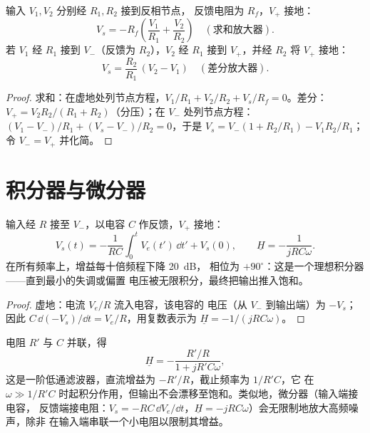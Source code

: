 \begin{proposition}[求和放大器与差分放大器]\label{prop:b1:operational-amplifier:sumdiff}
输入 $V_1, V_2$ 分别经 $R_1, R_2$ 接到反相节点，
反馈电阻为 $R_f$，$V_+$ 接地：
\[
V_s = -R_f\left(\frac{V_1}{R_1} + \frac{V_2}{R_2}\right)
\quad (\text{求和放大器}).
\]
若 $V_1$ 经 $R_1$ 接到 $V_-$（反馈为 $R_2$），$V_2$ 经
$R_1$ 接到 $V_+$，并经 $R_2$ 将 $V_+$ 接地：
\[
V_s = \frac{R_2}{R_1}\,(V_2 - V_1)
\quad (\text{差分放大器}).
\]
\end{proposition}

\begin{proof}
求和：在虚地处列节点方程，$V_1/R_1 + V_2/R_2 + V_s/R_f =
0$。差分：$V_+ = V_2R_2/(R_1 + R_2)$（分压）；在 $V_-$ 处列节点方程：
$(V_1 - V_-)/R_1 + (V_s - V_-)/R_2 = 0$，于是 $V_s = V_-(1 + R_2/R_1) -
V_1R_2/R_1$；令 $V_- = V_+$ 并化简。
\end{proof}

\section{积分器与微分器}

\begin{proposition}[积分器]\label{prop:b1:operational-amplifier:integrator}
输入经 $R$ 接至 $V_-$，以电容 $C$ 作反馈，$V_+$
接地：
\[
V_s(t) = -\frac{1}{RC}\int_0^t V_e(t')\,\dd t' + V_s(0),
\qquad
\underline H = -\frac{1}{jRC\omega} .
\]
在所有频率上，增益每十倍频程下降 \qty{20}{dB}，
相位为 $+90^\circ$：这是一个理想积分器——直到最小的失调或偏置
电压被无限积分，最终把输出推入饱和。
\end{proposition}

\begin{proof}
虚地：电流 $V_e/R$ 流入电容，该电容的
电压（从 $V_-$ 到输出端）为 $-V_s$；因此 $C\,\dd(-V_s)/\dd t
= V_e/R$，用复数表示为 $\underline H = -1/(jRC\omega)$。
\end{proof}

\begin{remark}[驯服积分器]\label{rem:b1:operational-amplifier:pseudo}
电阻 $R'$ 与 $C$ 并联，得
\[
\underline H = -\frac{R'/R}{1 + jR'C\omega},
\]
这是一阶低通滤波器，直流增益为 $-R'/R$，截止频率为 $1/R'C$，它
在 $\omega \gg 1/R'C$ 时起积分作用，但输出不会漂移至饱和。类似地，微分器（输入端接电容，
反馈端接电阻：$V_s = -RC\,\dd V_e/\dd t$，$\underline H =
-jRC\omega$）会无限制地放大高频噪声，除非
在输入端串联一个小电阻以限制其增益。
\end{remark}

